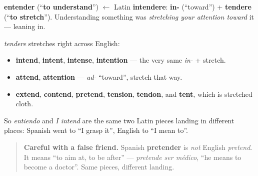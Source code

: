 \begin{cousinweb}
\textbf{entender} (\textquotedblleft{}\textbf{to understand}\textquotedblright{}) $\leftarrow$ Latin \textbf{intendere}: \textbf{in-} (\textquotedblleft{}toward\textquotedblright{}) + \textbf{tendere} (\textquotedblleft{}\textbf{to stretch}\textquotedblright{}). Understanding something was \emph{stretching your attention toward} it — leaning in.

\emph{tendere} stretches right across English:

\begin{itemize}
\raggedright
  \item \textbf{intend}, \textbf{intent}, \textbf{intense}, \textbf{intention} — the very same \emph{in-} + stretch.
  \item \textbf{attend}, \textbf{attention} — \emph{ad-} \textquotedblleft{}toward\textquotedblright{}, stretch that way.
  \item \textbf{extend}, \textbf{contend}, \textbf{pretend}, \textbf{tension}, \textbf{tendon}, and \textbf{tent}, which is stretched cloth.
\end{itemize}

So \emph{entiendo} and \emph{I intend} are the same two Latin pieces landing in different places: Spanish went to \textquotedblleft{}I grasp it\textquotedblright{}, English to \textquotedblleft{}I mean to\textquotedblright{}.

\begin{quote}
\textbf{Careful with a false friend.} Spanish \textbf{pretender} is \emph{not} English \emph{pretend}. It means \textquotedblleft{}to aim at, to be after\textquotedblright{} — \emph{pretende ser médico}, \textquotedblleft{}he means to become a doctor\textquotedblright{}. Same pieces, different landing.
\end{quote}
\end{cousinweb}

